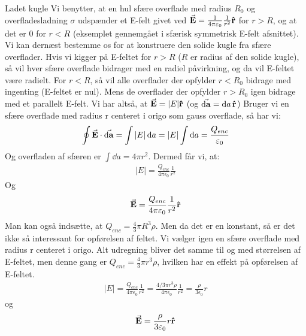 \documentclass[crop=false, class=memoir]{standalone}
\begin{document}
\begin{opgave}{Ladet kugle}
    \opg
    Vi benytter, at en hul sfære overflade med radius $R_0$ og overfladesladning $\sigma$ udspænder et E-felt givet ved $\va{E}=\frac{1}{4\pi\varepsilon_0}\frac{1}{r^2}\vu{r}$ for $r>R$, og at det er $0$ for $r<R$ (eksemplet gennemgået i sfærisk symmetrisk E-felt afsnittet). Vi kan dernæst bestemme os for at konstruere den solide kugle fra sfære overflader. Hvis vi kigger på E-feltet for $r>R$ ($R$ er radius af den solide kugle), så vil hver sfære overflade bidrager med en radiel påvirkning, og da vil E-feltet være radielt. For $r<R$, så vil alle overflader der opfylder $r<R_0$ bidrage med ingenting (E-feltet er nul). Mens de overflader der opfylder $r>R_0$ igen bidrage med et parallelt E-felt. Vi har altså, at $\va{E}=|E|\vu{r}$ (og $\va{\dd{a}}=\dd{a}\vu{r}$)
    \opg
    Bruger vi en sfære overflade med radius r centeret i origo som gauss overflade, så har vi:
    \begin{align*}
        \oint\va{E}\cdot\va{\dd{a}}=\int|E|\dd{a}=|E|\int\dd{a}=\frac{Q_{enc}}{\varepsilon_0}
    \end{align*}
    Og overfladen af sfæren er $\int\dd{a}=4\pi r^2$. Dermed får vi, at:
    \begin{align*}
        |E|=\frac{Q_{enc}}{4\pi \epsilon_0}\frac{1}{r^2}
    \end{align*}
    Og
    \begin{align*}
        \va{E}=\frac{Q_{enc}}{4\pi \varepsilon_0}\frac{1}{r^2}\vu{r}
    \end{align*}
    Man kan også indsætte, at $Q_{enc}=\frac{4}{3}\pi R^3\rho$. Men da det er en konstant, så er det ikke så interessant for opførelsen af feltet.
    \opg
    Vi vælger igen en sfære overflade med radius r centeret i origo. Alt udregning bliver det samme til og med størrelsen af E-feltet, men denne gang er $Q_{enc}=\frac{4}{3}\pi r^3\rho$, hvilken har en effekt på opførelsen af E-feltet.
    \begin{align*}
        |E|=\frac{Q_{enc}}{4\pi \epsilon_0}\frac{1}{r^2}=\frac{4/3\pi r^3\rho}{4\pi \epsilon_0}\frac{1}{r^2}=\frac{\rho}{3\epsilon_0}r
    \end{align*}
    og
    \begin{align*}
        \va{E}=\frac{\rho}{3\varepsilon_0}r\vu{r}
    \end{align*}
\end{opgave}
\end{document}
